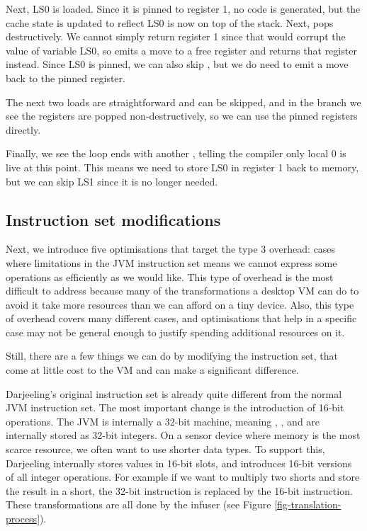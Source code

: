 Next, LS0 is loaded. Since it is pinned to register 1, no code is generated, but the cache state is updated to reflect LS0 is now on top of the stack. Next,  pops destructively. We cannot simply return register 1 since that would corrupt the value of variable LS0, so  emits a move to a free register and returns that register instead. Since LS0 is pinned, we can also skip , but we do need to emit a move back to the pinned register.

The next two loads are straightforward and can be skipped, and in the branch we see the registers are popped non-destructively, so we can use the pinned registers directly.

Finally, we see the loop ends with another , telling the compiler only local 0 is live at this point. This means we need to store LS0 in register 1 back to memory, but we can skip LS1 since it is no longer needed.

\subsection{Instruction set modifications}
Next, we introduce five optimisations that target the type 3 overhead: cases where limitations in the JVM instruction set means we cannot express some operations as efficiently as we would like. This type of overhead is the most difficult to address because many of the transformations a desktop VM can do to avoid it take more resources than we can afford on a tiny device. Also, this type of overhead covers many different cases, and optimisations that help in a specific case may not be general enough to justify spending additional resources on it.

Still, there are a few things we can do by modifying the instruction set, that come at little cost to the VM and can make a significant difference.

Darjeeling's original instruction set is already quite different from the normal JVM instruction set. The most important change is the introduction of 16-bit operations. The JVM is internally a 32-bit machine, meaning , , and  are internally stored as 32-bit integers. On a sensor device where memory is the most scarce resource, we often want to use shorter data types. To support this, Darjeeling internally stores values in 16-bit slots, and introduces 16-bit versions of all integer operations. For example if we want to multiply two shorts and store the result in a short, the 32-bit  instruction is replaced by the 16-bit  instruction. These transformations are all done by the infuser (see Figure \ref{fig-translation-process}).

